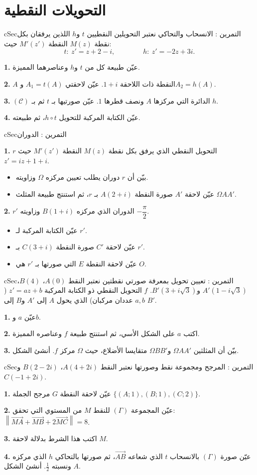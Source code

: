\documentclass[12pt,a4paper]{article}
\newenvironment{BOX}[2]{\begin{otherlanguage}{english}\begin{arbox}{#1}{#2}}{\end{arbox}\end{otherlanguage}}
\newcounter{exo}
\newenvironment{tamrin}[1]{\stepcounter{exo}\begin{BOX}{cSec}{التمرين \theexo: #1}}{\end{BOX}}
\newenvironment{sq}{\begin{itemize}[leftmargin=2.4em,itemsep=3pt]}{\end{itemize}}
\newcommand{\qa}{\item[(أ)]}\newcommand{\qb}{\item[(ب)]}\newcommand{\qc}{\item[(جـ)]}\newcommand{\qd}{\item[(د)]}\newcommand{\qe}{\item[(هـ)]}
\newcommand{\QQ}[1]{\par\smallskip\textbf{#1.} }
\begin{document}
\section{التحويلات النقطية}

\begin{tamrin}{الانسحاب والتحاكي}
نعتبر التحويلين النقطيين $t$ و$h$ اللذين يرفقان بكل نقطة $M(z)$ النقطة $M'(z')$ حيث:
\[t:\ z'=z+2-i,\qquad\qquad h:\ z'=-2z+3i.\]
\QQ{1} عيّن طبيعة كل من $t$ و$h$ وعناصرهما المميزة.
\QQ{2} $A$ النقطة ذات اللاحقة $1+i$. عيّن لاحقتي $A_1=t(A)$ و$A_2=h(A)$.
\QQ{3} $(\mathcal C)$ الدائرة التي مركزها $A$ ونصف قطرها $1$. عيّن صورتيها بـ $t$ ثم بـ $h$.
\QQ{4} عيّن الكتابة المركبة للتحويل $h\circ t$، ثم طبيعته.
\end{tamrin}

\begin{tamrin}{الدوران}
\QQ{1} $r$ التحويل النقطي الذي يرفق بكل نقطة $M(z)$ النقطة $M'(z')$ حيث $z'=iz+1+i$.
\begin{sq}
\qa بيّن أن $r$ دوران يطلب تعيين مركزه $\Omega$ وزاويته.
\qb عيّن لاحقة $A'$ صورة النقطة $A(2+i)$ بـ $r$، ثم استنتج طبيعة المثلث $\Omega AA'$.
\end{sq}
\QQ{2} $r'$ الدوران الذي مركزه $B(1+i)$ وزاويته $-\dfrac\pi2$.
\begin{sq}
\qa عيّن الكتابة المركبة لـ $r'$.
\qb عيّن لاحقة $C'$ صورة النقطة $C(3+i)$ بـ $r'$.
\qc عيّن لاحقة النقطة $E$ التي صورتها بـ $r'$ هي $O$.
\end{sq}
\end{tamrin}

\begin{tamrin}{تعيين تحويل بمعرفة صورتي نقطتين}
نعتبر النقط $A(0)$، $B(4)$، $A'\left(1-i\sqrt3\right)$ و$B'\left(3+i\sqrt3\right)$.
$f$ التحويل النقطي ذو الكتابة المركبة $z'=az+b$ ($a,b$ عددان مركبان) الذي يحول $A$ إلى $A'$ و$B$ إلى $B'$.
\QQ{1} عيّن $a$ و$b$.
\QQ{2} اكتب $a$ على الشكل الأسي، ثم استنتج طبيعة $f$ وعناصره المميزة.
\QQ{3} بيّن أن المثلثين $\Omega AA'$ و$\Omega BB'$ متقايسا الأضلاع، حيث $\Omega$ مركز $f$. أنشئ الشكل.
\end{tamrin}

\begin{tamrin}{المرجح ومجموعة نقط وصورتها}
نعتبر النقط $A(4+2i)$، $B(2-2i)$ و$C(-1+2i)$.
\QQ{1} عيّن لاحقة النقطة $G$ مرجح الجملة $\{(A;1),(B;1),(C;2)\}$.
\QQ{2} عيّن المجموعة $(\Gamma)$ للنقط $M$ من المستوي التي تحقق: $\left\|\overrightarrow{MA}+\overrightarrow{MB}+2\overrightarrow{MC}\right\|=8$.
\QQ{3} اكتب هذا الشرط بدلالة لاحقة $M$.
\QQ{4} عيّن صورة $(\Gamma)$ بالانسحاب $t$ الذي شعاعه $\overrightarrow{AB}$، ثم صورتها بالتحاكي $h$ الذي مركزه $A$ ونسبته $\frac12$. أنشئ الشكل.
\end{tamrin}
\end{document}
